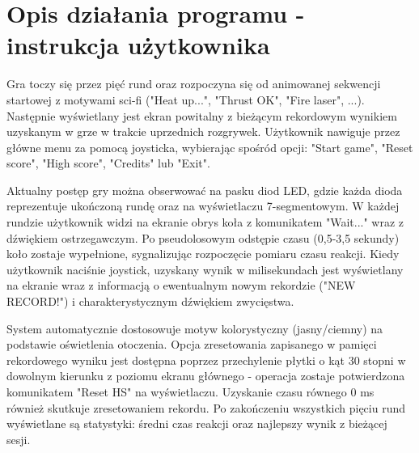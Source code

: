 \documentclass[a4paper,12pt]{report}
\begin{document}
\chapter{Opis działania programu - instrukcja użytkownika}
Gra toczy się przez pięć rund oraz rozpoczyna się od animowanej sekwencji startowej z motywami sci-fi ("Heat up...", "Thrust OK", "Fire laser", ...). Następnie wyświetlany jest ekran powitalny z bieżącym rekordowym wynikiem uzyskanym w grze w trakcie uprzednich rozgrywek. Użytkownik nawiguje przez główne menu za pomocą joysticka, wybierając spośród opcji: "Start game", "Reset score", "High score", "Credits" lub "Exit".

Aktualny postęp gry można obserwować na pasku diod LED, gdzie każda dioda reprezentuje ukończoną rundę oraz na wyświetlaczu 7-segmentowym. W każdej rundzie użytkownik widzi na ekranie obrys koła z komunikatem "Wait..." wraz z dźwiękiem ostrzegawczym. Po pseudolosowym odstępie czasu (0,5-3,5 sekundy) koło zostaje wypełnione, sygnalizując rozpoczęcie pomiaru czasu reakcji. Kiedy użytkownik naciśnie joystick, uzyskany wynik w milisekundach jest wyświetlany na ekranie wraz z informacją o ewentualnym nowym rekordzie ("NEW RECORD!") i charakterystycznym dźwiękiem zwycięstwa.

System automatycznie dostosowuje motyw kolorystyczny (jasny/ciemny) na podstawie oświetlenia otoczenia. Opcja zresetowania zapisanego w pamięci rekordowego wyniku jest dostępna poprzez przechylenie płytki o kąt 30 stopni w dowolnym kierunku z poziomu ekranu głównego - operacja zostaje potwierdzona komunikatem "Reset HS" na wyświetlaczu. Uzyskanie czasu równego 0 ms również skutkuje zresetowaniem rekordu. Po zakończeniu wszystkich pięciu rund wyświetlane są statystyki: średni czas reakcji oraz najlepszy wynik z bieżącej sesji.
\end{document}
